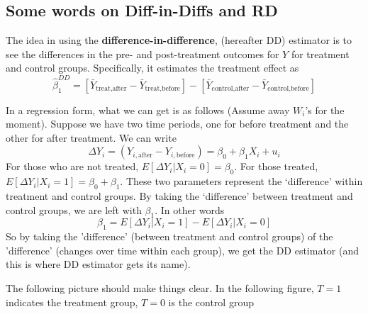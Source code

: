 \documentclass[12pt]{article}
\theoremstyle{definition}
\theoremstyle{property}
\theoremstyle{assumption}
\theoremstyle{example}
\theoremstyle{comment}
\begin{document}
\subsection{Some words on Diff-in-Diffs and RD}
The idea in using the \textbf{difference-in-difference}, (hereafter DD) estimator is to see the differences in the pre- and post-treatment outcomes for $Y$ for treatment and control groups. Specifically, it estimates the treatment effect as
\[
\hat{\beta}_1^{DD}=[\bar{Y}_{\text{treat,after}}-\bar{Y}_{\text{treat,before}}]-[\bar{Y}_{\text{control,after}}-\bar{Y}_{\text{control,before}}]
\]\par\medskip
In a regression form, what we can get is as follows (Assume away $W_i$'s for the moment). Suppose we have two time periods, one for before treatment and the other for after treatment. We can write
\[
\Delta Y_i=(Y_{i,\text{after}}-Y_{i,\text{before}}) = \beta_0+\beta_1X_i+u_i
\]
For those who are not treated, $E[\Delta Y_i|X_i=0]=\beta_0$. For those treated, $E[\Delta Y_i|X_i=1]=\beta_0+\beta_1$. These two parameters represent the `difference' within treatment and control groups. By taking the `difference' between treatment and control groups, we are left with $\beta_1$. In other words
\[
\beta_1 = E[\Delta Y_i|X_i=1]-E[\Delta Y_i|X_i=0]
\]
So by taking the 'difference' (between treatment and control groups) of the 'difference' (changes over time within each group), we get the DD estimator (and this is where DD estimator gets its name). \par\medskip
The following picture should make things clear. In the following figure, $T=1$ indicates the treatment group, $T=0$ is the control group
\end{document}
